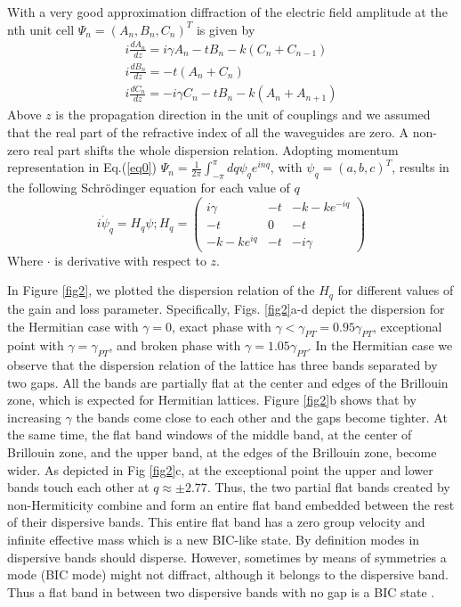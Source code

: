 \documentclass[aps,prl,twocolumn,showpacs,groupedaddress,amsmath,amssymb]{revtex4}
\begin{document}
With a very good approximation diffraction of the electric field amplitude at the nth unit cell $\Psi_n=(A_n,B_n,C_n)^T$ is given by 
\begin{equation}
\begin{array}{c}
i\frac{dA_n}{dz}=i\gamma A_n-tB_n-k(C_n+C_{n-1})\\
i\frac{dB_n}{dz}=-t(A_n+C_n)\\
i\frac{dC_n}{dz}=-i\gamma C_n-tB_n-k(A_n+A_{n+1})
\end{array}
\label{eq0}
\end{equation}
Above $z$ is the propagation direction in the unit of couplings and we assumed that the real part of the refractive index of all the waveguides are zero. A non-zero real part shifts the whole dispersion relation. Adopting momentum representation in Eq.(\ref{eq0}) $\Psi_n=\frac{1}{2\pi}\int_{-\pi}^{\pi}dq\psi_q e^{inq}$, with $\psi_q=(a,b,c)^T$, results in the following Schr\"{o}dinger equation for each value of $q$ 
\begin{equation}
i\dot\psi_q=H_q\psi; H_q=\left(\begin{array}{ccc}
i\gamma&-t&-k-ke^{-iq}\\
-t&0&-t\\
-k-ke^{iq}&-t&-i\gamma
\end{array}\right)
\label{eq1}
\end{equation}
Where $\cdot{}$ is derivative with respect to $z$.

In Figure \ref{fig2}, we plotted the dispersion relation of the $H_q$ for different values of the gain and loss parameter. Specifically, Figs. \ref{fig2}a-d depict the dispersion for the Hermitian case with $\gamma=0$, exact phase with $\gamma<\gamma_{PT}=0.95\gamma_{PT}$, exceptional point with $\gamma=\gamma_{PT}$, and broken phase with $\gamma=1.05\gamma_{PT}$. In the Hermitian case we observe that the dispersion relation of the lattice has three bands separated by two gaps. All the bands are partially flat at the center and edges of the Brillouin zone, which is expected for Hermitian lattices. Figure \ref{fig2}b shows that by increasing $\gamma$ the bands come close to each other and the gaps become tighter. At the same time, the flat band windows of the middle band, at the center of Brillouin zone, and the upper band, at the edges of the Brillouin zone, become wider. As depicted in Fig \ref{fig2}c, at the exceptional point the upper and lower bands touch each other at $q\approx\pm2.77$. Thus, the two partial flat bands created by non-Hermiticity combine and form an entire flat band embedded between the rest of their dispersive bands. This entire flat band has a zero group velocity and infinite effective mass which is a new BIC-like state. By definition modes in dispersive bands should disperse. However, sometimes by means of symmetries a mode (BIC mode) might not diffract, although it belongs to the dispersive band. Thus a flat band in between two dispersive bands with no gap is a BIC state \cite{8,9}.
\end{document}
